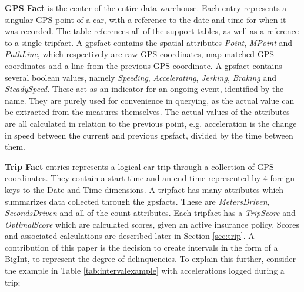 \textbf{GPS Fact} is the center of the entire data warehouse. Each entry represents a singular GPS point of a car, with a reference to the date and time for when it was recorded. The table references all of the support tables, as well as a reference to a single tripfact. A gpsfact contains the spatial attributes \textit{Point}, \textit{MPoint} and \textit{PathLine}, which respectively are raw GPS coordinates, map-matched GPS coordinates and a line from the previous GPS coordinate. A gpsfact contains several boolean values, namely \textit{Speeding}, \textit{Accelerating}, \textit{Jerking}, \textit{Braking} and \textit{SteadySpeed}. These act as an indicator for an ongoing event, identified by the name. They are purely used for convenience in querying, as the actual value can be extracted from the measures themselves. The actual values of the attributes are all calculated in relation to the previous point, e.g. acceleration is the change in speed between the current and previous gpsfact, divided by the time between them.

\textbf{Trip Fact} entries represents a logical car trip through a collection of GPS coordinates. They contain a start-time and an end-time represented by 4 foreign keys to the Date and Time dimensions. A tripfact has many attributes which summarizes data collected through the gpsfacts. These are \textit{MetersDriven}, \textit{SecondsDriven} and all of the count attributes. Each tripfact has a \textit{TripScore} and \textit{OptimalScore} which are calculated scores, given an active insurance policy. Scores and associated calculations are described later in Section \ref{sec:trip}. A contribution of this paper is the decision to create intervals in the form of a BigInt, to represent the degree of delinquencies. To explain this further, consider the example in Table \ref{tab:intervalexample} with accelerations logged during a trip; 

